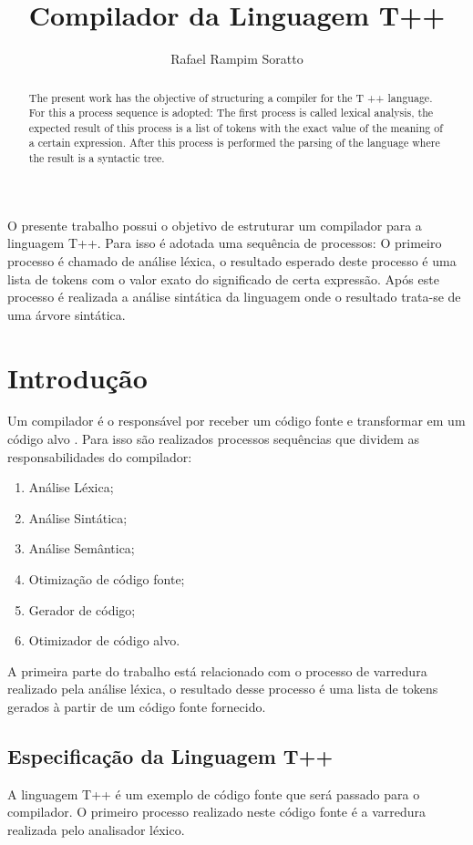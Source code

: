 \documentclass[12pt]{article}
\title{Compilador da Linguagem T++}
\author{Rafael Rampim Soratto \inst{1}}
\begin{document}
 

\maketitle

\begin{abstract}
The present work has the objective of structuring a compiler for the T ++ language. For this a process sequence is adopted: The first process is called lexical analysis, the expected result of this process is a list of tokens with the exact value of the meaning of a certain expression. After this process is performed the parsing of the language where the result is a syntactic tree.
\end{abstract}
     
\begin{resumo} 
  O presente trabalho possui o objetivo de estruturar um compilador para a linguagem T++. Para isso é adotada uma sequência de processos: O primeiro processo é chamado de análise léxica, o resultado esperado deste processo é uma lista de tokens com o valor exato do significado de certa expressão. Após este processo é realizada a análise sintática da linguagem onde o resultado trata-se de uma árvore sintática.
\end{resumo}
 

\section{Introdução} 
Um compilador é o responsável por receber um código fonte e transformar em um código alvo \cite{louden}. Para isso são realizados processos sequências que dividem as responsabilidades do compilador: 
\begin{enumerate}
	\item Análise Léxica; 
	\item Análise Sintática; 
	\item Análise Semântica; 
	\item Otimização de código fonte; 
	\item Gerador de código; 
	\item Otimizador de código alvo. 
\end{enumerate}  
A primeira parte do trabalho está relacionado com o processo de varredura realizado pela análise léxica, o resultado desse processo é uma lista de tokens gerados à partir de um código fonte fornecido. 
\subsection{Especificação da Linguagem T++}  
A linguagem T++ é um exemplo de código fonte que será passado para o compilador. O primeiro processo realizado neste código fonte é a varredura realizada pelo analisador léxico.  
\end{document}
